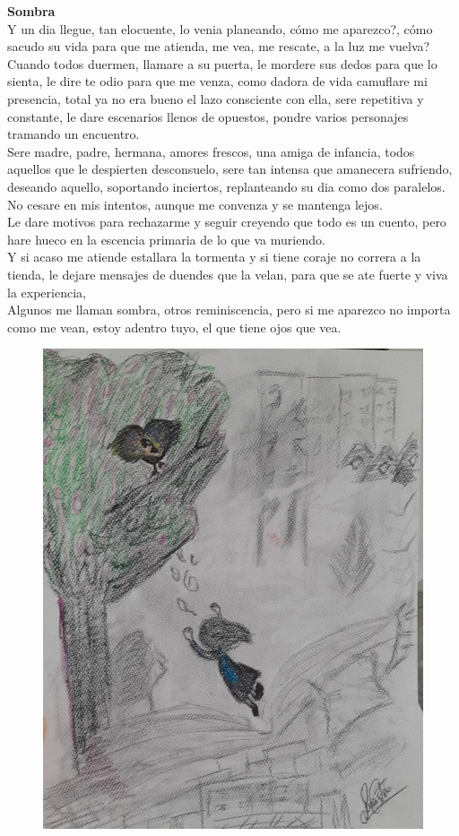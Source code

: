 \documentclass[12pt, a4paper, twoside]{book} %
\begin{document}
\noindent\textbf{Sombra}\\
Y un dia llegue, tan elocuente, lo venia planeando, cómo me aparezco?, cómo sacudo su vida para que me atienda, me vea, me rescate, a la luz me vuelva?\\
Cuando todos duermen, llamare a su puerta, le mordere sus dedos para que lo sienta, le dire te odio para que me venza, como dadora de vida camuflare mi presencia, total ya no era bueno el lazo consciente con ella, sere repetitiva y constante, le dare escenarios llenos de opuestos, pondre varios personajes tramando  un encuentro.\\
Sere madre, padre, hermana, amores frescos, una amiga de infancia, todos aquellos que le despierten desconsuelo, sere tan intensa que amanecera sufriendo, deseando aquello, soportando inciertos, replanteando su dia como dos paralelos.\\
No cesare en mis intentos, aunque me convenza y se mantenga lejos.\\
Le dare motivos para rechazarme y seguir creyendo que todo es un cuento, pero hare hueco en la escencia primaria de lo que va muriendo.\\
Y si acaso me atiende estallara la tormenta y si tiene coraje no correra a la tienda, le dejare mensajes de duendes que la velan, para que se ate fuerte y viva la experiencia,\\
Algunos me llaman sombra, otros reminiscencia, pero si me aparezco no importa como me vean, estoy adentro tuyo, el que tiene ojos que vea.

\begin{figure}[H]
	\centering
	\includegraphics[width=\textwidth]{./images/1f81324df14aba.jpg}
\end{figure}
\end{document}
